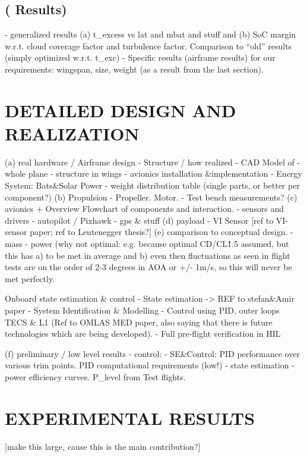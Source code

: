 \documentclass[letterpaper, 10 pt, conference]{ieeeconf}  %
\begin{document}
 \subsection{( Results)}
   - generalized results (a) t\_excess vs lat and mbat and stuff and (b) SoC margin w.r.t. cloud coverage factor and turbulence factor. Comparison to ``old'' results (simply optimized w.r.t. t\_exc)
   - Specific results (airframe results) for our requirements: wingspan, size, weight (as a result from the last section).
  
\section{DETAILED DESIGN AND REALIZATION}

(a) real hardware / Airframe design
  - Structure / how realized
  - CAD Model of
  	- whole plane
  	- structure in wings
  	- avionics installation \&implementation
   - Energy System: Bats\&Solar Power
   - weight distribution table (single parts, or better per component?)
(b) Propulsion
  - Propeller. Motor.
  - Test bench measurements?
(c) avionics
 + Overview Flowchart of components and interaction.
   - sensors and drivers
   - autopilot / Pixhawk
   - gps \& stuff
(d) payload
  - VI Sensor [ref to VI-sensor paper; ref to Leutenegger thesis?]
(e) comparison to conceptual design.
  - mass
   - power (why not optimal: e.g. because optimal CD/CL\^1.5 assumed, but this has a) to be met in average and b) even then fluctuations as seen in flight tests are on the order of 2-3 degrees in AOA or +/- 1m/s, so this will never be met perfectly.

Onboard state estimation \& control
 - State estimation -> REF to stefan\&Amir paper
 - System Identification \& Modelling
 - Control using PID,  outer loops TECS \& L1 (Ref to OMLAS MED paper, also saying that there is future technologies which are being developed).
 - Full pre-flight verification in HIL
 
 (f) preliminary / low level results
  - control:   - SE\&Control: PID performance over various trim points. PID computational requirements (low!)
  - state estimation
   - power efficiency curves. P\_level from Test flights.
 
 \section{EXPERIMENTAL RESULTS}
 
 [make this large, cause this is the main contribution?]
\end{document}
